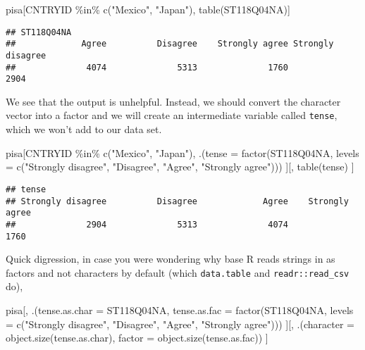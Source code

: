 \documentclass[
]{book}
\newenvironment{Shaded}{\begin{snugshade}}{\end{snugshade}}
\newcommand{\AttributeTok}[1]{\textcolor[rgb]{0.77,0.63,0.00}{#1}}
\newcommand{\FunctionTok}[1]{\textcolor[rgb]{0.00,0.00,0.00}{#1}}
\newcommand{\NormalTok}[1]{#1}
\newcommand{\SpecialCharTok}[1]{\textcolor[rgb]{0.00,0.00,0.00}{#1}}
\newcommand{\StringTok}[1]{\textcolor[rgb]{0.31,0.60,0.02}{#1}}
\begin{document}
\begin{Shaded}
\begin{Highlighting}[]
\NormalTok{pisa[CNTRYID }\SpecialCharTok{\%in\%} \FunctionTok{c}\NormalTok{(}\StringTok{"Mexico"}\NormalTok{, }\StringTok{"Japan"}\NormalTok{),}
     \FunctionTok{table}\NormalTok{(ST118Q04NA)]}
\end{Highlighting}
\end{Shaded}

\begin{verbatim}
## ST118Q04NA
##             Agree          Disagree    Strongly agree Strongly disagree 
##              4074              5313              1760              2904
\end{verbatim}

We see that the output is unhelpful. Instead, we should convert the character vector into a factor and we will create an intermediate variable called \texttt{tense}, which we won't add to our data set.

\begin{Shaded}
\begin{Highlighting}[]
\NormalTok{pisa[CNTRYID }\SpecialCharTok{\%in\%} \FunctionTok{c}\NormalTok{(}\StringTok{"Mexico"}\NormalTok{, }\StringTok{"Japan"}\NormalTok{),}
\NormalTok{     .(}\AttributeTok{tense =} \FunctionTok{factor}\NormalTok{(ST118Q04NA, }\AttributeTok{levels =} \FunctionTok{c}\NormalTok{(}\StringTok{"Strongly disagree"}\NormalTok{, }\StringTok{"Disagree"}\NormalTok{, }\StringTok{"Agree"}\NormalTok{, }\StringTok{"Strongly agree"}\NormalTok{)))}
\NormalTok{     ][,}
       \FunctionTok{table}\NormalTok{(tense)}
\NormalTok{     ]}
\end{Highlighting}
\end{Shaded}

\begin{verbatim}
## tense
## Strongly disagree          Disagree             Agree    Strongly agree 
##              2904              5313              4074              1760
\end{verbatim}

Quick digression, in case you were wondering why base R reads strings in as factors and not characters by default (which \texttt{data.table} and \texttt{readr::read\_csv} do),

\begin{Shaded}
\begin{Highlighting}[]
\NormalTok{pisa[, .(}\AttributeTok{tense.as.char =}\NormalTok{ ST118Q04NA,}
         \AttributeTok{tense.as.fac =} \FunctionTok{factor}\NormalTok{(ST118Q04NA, }\AttributeTok{levels =} \FunctionTok{c}\NormalTok{(}\StringTok{"Strongly disagree"}\NormalTok{, }\StringTok{"Disagree"}\NormalTok{, }\StringTok{"Agree"}\NormalTok{, }\StringTok{"Strongly agree"}\NormalTok{)))}
\NormalTok{     ][,}
\NormalTok{       .(}\AttributeTok{character =} \FunctionTok{object.size}\NormalTok{(tense.as.char),}
         \AttributeTok{factor =} \FunctionTok{object.size}\NormalTok{(tense.as.fac))}
\NormalTok{     ]}
\end{Highlighting}
\end{Shaded}
\end{document}
